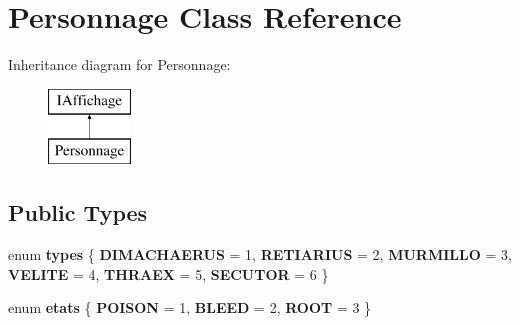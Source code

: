 \hypertarget{class_personnage}{\section{\-Personnage \-Class \-Reference}
\label{class_personnage}
}
\-Inheritance diagram for \-Personnage\-:\begin{figure}[H]
\begin{center}
\leavevmode
\includegraphics[height=2.000000cm]{class_personnage}
\end{center}
\end{figure}
\subsection*{\-Public \-Types}
\begin{DoxyCompactItemize}
\item 
enum {\bfseries types} \{ \*
{\bfseries \-D\-I\-M\-A\-C\-H\-A\-E\-R\-U\-S} =  1, 
{\bfseries \-R\-E\-T\-I\-A\-R\-I\-U\-S} =  2, 
{\bfseries \-M\-U\-R\-M\-I\-L\-L\-O} =  3, 
{\bfseries \-V\-E\-L\-I\-T\-E} =  4, 
\*
{\bfseries \-T\-H\-R\-A\-E\-X} =  5, 
{\bfseries \-S\-E\-C\-U\-T\-O\-R} =  6
 \}
\item 
enum {\bfseries etats} \{ {\bfseries \-P\-O\-I\-S\-O\-N} =  1, 
{\bfseries \-B\-L\-E\-E\-D} =  2, 
{\bfseries \-R\-O\-O\-T} =  3
 \}
\end{DoxyCompactItemize}
